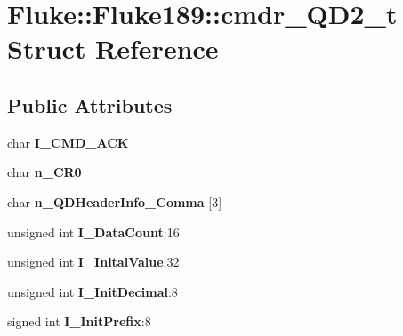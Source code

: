 \hypertarget{structFluke_1_1Fluke189_1_1cmdr__QD2__t}{
\section{Fluke::Fluke189::cmdr\_\-QD2\_\-t Struct Reference}
\label{structFluke_1_1Fluke189_1_1cmdr__QD2__t}
}
\subsection*{Public Attributes}
\begin{DoxyCompactItemize}
\item 
\hypertarget{structFluke_1_1Fluke189_1_1cmdr__QD2__t_a8254c38cc41f017f9684d20065ef3950}{
char {\bfseries I\_\-CMD\_\-ACK}}
\label{structFluke_1_1Fluke189_1_1cmdr__QD2__t_a8254c38cc41f017f9684d20065ef3950}

\item 
\hypertarget{structFluke_1_1Fluke189_1_1cmdr__QD2__t_ad57e0c44d7f2bcd7b1c5eddbadf10775}{
char {\bfseries n\_\-CR0}}
\label{structFluke_1_1Fluke189_1_1cmdr__QD2__t_ad57e0c44d7f2bcd7b1c5eddbadf10775}

\item 
\hypertarget{structFluke_1_1Fluke189_1_1cmdr__QD2__t_a4a897c2ffcd6985662f7756e7fd37ee4}{
char {\bfseries n\_\-QDHeaderInfo\_\-Comma} \mbox{[}3\mbox{]}}
\label{structFluke_1_1Fluke189_1_1cmdr__QD2__t_a4a897c2ffcd6985662f7756e7fd37ee4}

\item 
\hypertarget{structFluke_1_1Fluke189_1_1cmdr__QD2__t_a445eb8eba3240c01c6d4de2c9d69fb68}{
unsigned int {\bfseries I\_\-DataCount}:16}
\label{structFluke_1_1Fluke189_1_1cmdr__QD2__t_a445eb8eba3240c01c6d4de2c9d69fb68}

\item 
\hypertarget{structFluke_1_1Fluke189_1_1cmdr__QD2__t_aa468131437b1fd35ea5149032e1f4528}{
unsigned int {\bfseries I\_\-InitalValue}:32}
\label{structFluke_1_1Fluke189_1_1cmdr__QD2__t_aa468131437b1fd35ea5149032e1f4528}

\item 
\hypertarget{structFluke_1_1Fluke189_1_1cmdr__QD2__t_a2674fd1dfe9ef48b786bf836083672b1}{
unsigned int {\bfseries I\_\-InitDecimal}:8}
\label{structFluke_1_1Fluke189_1_1cmdr__QD2__t_a2674fd1dfe9ef48b786bf836083672b1}

\item 
\hypertarget{structFluke_1_1Fluke189_1_1cmdr__QD2__t_a8599e4751cc1b4cdde359042450e3075}{
signed int {\bfseries I\_\-InitPrefix}:8}
\label{structFluke_1_1Fluke189_1_1cmdr__QD2__t_a8599e4751cc1b4cdde359042450e3075}


\end{DoxyCompactItemize}
